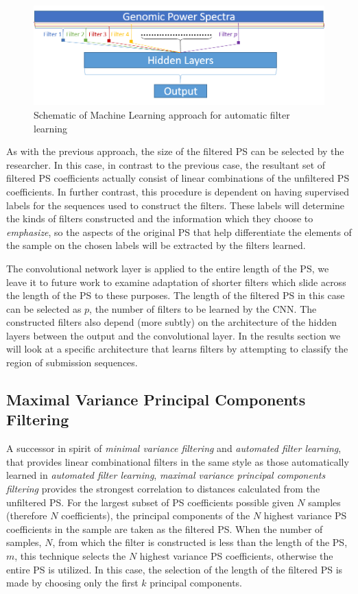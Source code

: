 \documentclass[10pt,conference]{IEEEtran}
\begin{document}
\begin{figure}[h!]
\centering
\caption{Schematic of Machine Learning approach for automatic filter learning \label{fig:mlschem} }
\includegraphics[scale=0.55]{Images/Files/afl.png}
\end{figure}

As with the previous approach, the size of the filtered PS can be selected by the researcher.
In this case, in contrast to the previous case, the resultant set of filtered PS coefficients actually consist of 
linear combinations of the unfiltered PS coefficients.  
In further contrast, this procedure is dependent on having supervised labels for the sequences used to construct 
the filters.  
These labels will determine the kinds of filters constructed and the information which they choose to 
\textit{emphasize}, so the aspects of the original PS that help differentiate the elements of the 
sample on the chosen labels will be extracted by the filters learned.  

The convolutional network layer is applied to the entire length of the PS, we leave it to future work to 
examine adaptation of shorter filters which slide across the length of the PS to these purposes.  
The length of the filtered PS in this case can be selected as $p$, the number of filters to be learned by the 
CNN.  
The constructed filters also depend (more subtly) on the architecture of the hidden layers between the output 
and the convolutional layer.  
In the results section we will look at a specific architecture that learns filters by attempting to classify the 
region of submission sequences. 

\subsection{Maximal Variance Principal Components Filtering}

\noindent A successor in spirit of \textit{minimal variance filtering} and \textit{automated filter learning}, that provides linear combinational filters in the same style as those automatically learned in \textit{automated filter learning}, \textit{maximal variance principal components filtering} provides the strongest correlation to 
distances calculated from the unfiltered PS. 
For the largest subset of PS coefficients possible given $N$ samples (therefore $N$ coefficients), the principal components of the $N$ highest variance PS coefficients in the sample are taken as the filtered PS. 
When the number of samples, $N$, from which the filter is constructed is less than the length of the PS, $m$, 
this technique selects the $N$ highest variance PS coefficients, otherwise the entire PS is utilized. 
In this case, the selection of the length of the filtered PS is made by choosing only the first $k$ principal 
components. 
\end{document}

